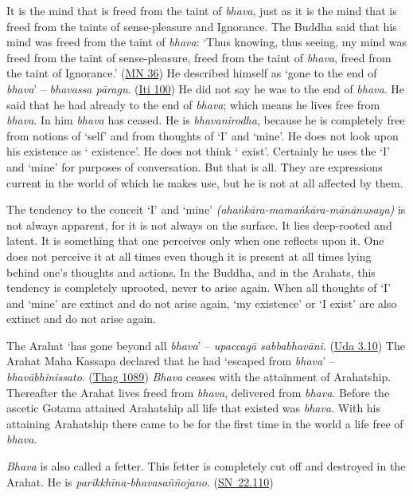 It is the mind that is freed from the taint of \emph{bhava}, just as it is the mind that is freed from the taints of sense-pleasure and Ignorance. The Buddha said that his mind was freed from the taint of \emph{bhava}: `Thus knowing, thus seeing, my mind was freed from the taint of sense-pleasure, freed from the taint of \emph{bhava}, freed from the taint of Ignorance.' (\href{https://suttacentral.net/mn36/en/bodhi}{MN 36}) He described himself as `gone to the end of \emph{bhava}' -- \emph{bhavassa pāragu}. (\href{https://suttacentral.net/iti100/en/sujato}{Iti 100}) He did not say he was  to the end of \emph{bhava}. He said that he had already  to the end of \emph{bhava}; which means he lives free from \emph{bhava}. In him \emph{bhava} has ceased. He is \emph{bhavanirodha}, because he is completely free from notions of `self' and from thoughts of `I' and `mine'. He does not look upon his existence as ` existence'. He does not think ` exist'. Certainly he uses the  `I' and `mine' for purposes of conversation. But that is all. They are expressions current in the world of which he makes use, but he is not at all affected by them.

The tendency to the conceit `I' and `mine' \emph{(ahaṅkāra-mamaṅkāra-mānānusaya)} is not always apparent, for it is not always on the surface. It lies deep-rooted and latent. It is something that one perceives only when one reflects upon it. One does not perceive it at all times even though it is present at all times lying behind one's thoughts and actions. In the Buddha, and in the Arahats, this tendency is completely uprooted, never to arise again. When all thoughts of `I' and `mine' are extinct and do not arise again, `my existence' or `I exist' are also extinct and do not arise again.

The Arahat `has gone beyond all \emph{bhava}' -- \emph{upaccagā sabbabhavāni}. (\href{https://suttacentral.net/ud3.10/en/sujato}{Uda 3.10}) The Arahat Maha Kassapa declared that he had `escaped from \emph{bhava}' -- \emph{bhavābhinissato}. (\href{https://suttacentral.net/thag18.1/en/sujato}{Thag 1089}) \emph{Bhava} ceases with the attainment of Arahatship. Thereafter the Arahat lives freed from \emph{bhava}, delivered from \emph{bhava}. Before the ascetic Gotama attained Arahatship all life that existed was \emph{bhava}. With his attaining Arahatship there came to be for the first time in the world a life free of \emph{bhava}.

\emph{Bhava} is also called a fetter. This fetter is completely cut off and destroyed in the Arahat. He is \emph{parikkhīna-bhavasaññojano}. (\href{https://suttacentral.net/sn22.110/en/sujato}{SN~22.110})

